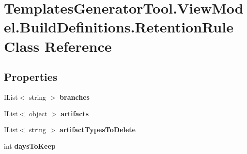 \hypertarget{class_templates_generator_tool_1_1_view_model_1_1_build_definitions_1_1_retention_rule}{}\section{Templates\+Generator\+Tool.\+View\+Model.\+Build\+Definitions.\+Retention\+Rule Class Reference}
\label{class_templates_generator_tool_1_1_view_model_1_1_build_definitions_1_1_retention_rule}
\subsection*{Properties}
\begin{DoxyCompactItemize}
\item 
\mbox{\label{class_templates_generator_tool_1_1_view_model_1_1_build_definitions_1_1_retention_rule_aefd4f05efe1d578edfd2e31893a48ed8}} 
I\+List$<$ string $>$ {\bfseries branches}
\item 
\mbox{\label{class_templates_generator_tool_1_1_view_model_1_1_build_definitions_1_1_retention_rule_a49b1900ca880294b2b69677a1dd78c33}} 
I\+List$<$ object $>$ {\bfseries artifacts}
\item 
\mbox{\label{class_templates_generator_tool_1_1_view_model_1_1_build_definitions_1_1_retention_rule_ac32344aa08cc9120c0037bf8998cb8be}} 
I\+List$<$ string $>$ {\bfseries artifact\+Types\+To\+Delete}
\item 
\mbox{\label{class_templates_generator_tool_1_1_view_model_1_1_build_definitions_1_1_retention_rule_a69679a576b3cc5ff755cac2c7d67111d}} 
int {\bfseries days\+To\+Keep}

\end{DoxyCompactItemize}
